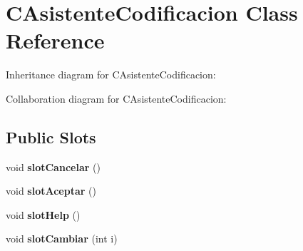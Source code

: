 \hypertarget{classCAsistenteCodificacion}{}\section{C\+Asistente\+Codificacion Class Reference}
\label{classCAsistenteCodificacion}


Inheritance diagram for C\+Asistente\+Codificacion\+:


Collaboration diagram for C\+Asistente\+Codificacion\+:
\subsection*{Public Slots}
\begin{DoxyCompactItemize}
\item 
void {\bfseries slot\+Cancelar} ()\hypertarget{classCAsistenteCodificacion_ab7f28d6c6468d1c92a85c655892d31f2}{}\label{classCAsistenteCodificacion_ab7f28d6c6468d1c92a85c655892d31f2}

\item 
void {\bfseries slot\+Aceptar} ()\hypertarget{classCAsistenteCodificacion_a64f692a920d95d1f482d52b57d865915}{}\label{classCAsistenteCodificacion_a64f692a920d95d1f482d52b57d865915}

\item 
void {\bfseries slot\+Help} ()\hypertarget{classCAsistenteCodificacion_a55c2125eb7a4cd4e48647976f21ad165}{}\label{classCAsistenteCodificacion_a55c2125eb7a4cd4e48647976f21ad165}

\item 
void {\bfseries slot\+Cambiar} (int i)\hypertarget{classCAsistenteCodificacion_ae1301ca578c8c5a8a90f26eb1a99110d}{}\label{classCAsistenteCodificacion_ae1301ca578c8c5a8a90f26eb1a99110d}

\end{DoxyCompactItemize}

